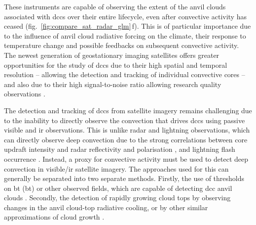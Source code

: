 These instruments are capable of observing the extent of the anvil clouds associated with \acrshort{dcc}s over their entire lifecycle, even after convective activity has ceased (fig.~\ref{fig:compare_sat_radar_glm}\,f).
This is of particular importance due to the influence of anvil cloud radiative forcing on the climate, their response to temperature change \citep{bony_thermodynamic_2016, hartmann_tropical_2016, ceppi_cloud_2017, gasparini_what_2019} and possible feedbacks on subsequent convective activity.
The newest generation of geostationary imaging satellites offers greater opportunities for the study of \acrshort{dcc}s due to their high spatial and temporal resolution -- allowing the detection and tracking of individual convective cores \citep{heikenfeld_tobac_2019} -- and also due to their high signal-to-noise ratio allowing research quality observations \citep{iacovazzi_goes-16_2020}.

The detection and tracking of \acrshort{dcc}s from satellite imagery remains challenging due to the inability to directly observe the convection that drives \acrshort{dcc}s using passive visible and \acrshort{ir} observations.
This is unlike radar and lightning observations, which can directly observe deep convection due to the strong correlations between core updraft intensity and radar reflectivity and polarisation \citep{austin_relation_1987, rosenfeld_general_1993, zipser_vertical_1994},  and lightning flash occurrence \citep{williams_relationship_1989, deierling_total_2008, wang_relationship_2017}.
Instead, a proxy for convective activity must be used to detect deep convection in visible/\acrshort{ir} satellite imagery.
The approaches used for this can generally be separated into two separate methods. 
Firstly, the use of thresholds on \acrshort{bt} (\acrshort{bt}) or other observed fields, which are capable of detecting \acrshort{dcc} anvil clouds \citep[e.g.][]{schmetz_monitoring_1997, hong_detection_2005, schroder_deep_2009, liang_integrated_2017, senf_size-resolved_2018}.
Secondly, the detection of rapidly growing cloud tops by observing changes in the anvil cloud-top radiative cooling, or by other similar approximations of cloud growth \citep{zinner_cb-tram_2008, bedka_objective_2010, muller_novel_2019}.

